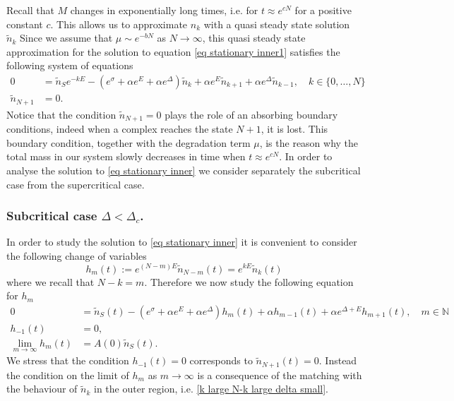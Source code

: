 \documentclass{article}
\numberwithin{equation}{section}
\theoremstyle{plain}
\begin{document}
Recall that $M$ changes in exponentially long times, i.e. for $t \approx e^{cN} $ for a positive constant $c$. 
This allows us to approximate $n_k$ with a quasi steady state solution $\tilde{n}_k$ 
Since we assume that $ \mu \sim e^{- b N } $ as $N \to \infty $, this quasi steady state approximation for the solution to equation \eqref{eq stationary inner1} satisfies the following system of equations
\begin{align} \label{eq stationary inner}
       0 &= \tilde{n}_S e^{- k E}  - \left( e^{\sigma } + \alpha e^E + \alpha e^\Delta  \right)   \tilde{n}_k + \alpha e^{E }  \tilde{n}_{k+1}  + \alpha e^{\Delta}  \tilde{n}_{k-1}, \quad  k \in \{0, \dots, N  \} \\
       \tilde{n}_{N+1}&=0. \nonumber
\end{align}
Notice that the condition $ \tilde{n}_{N+1} =0$ plays the role of an absorbing boundary conditions, indeed when a complex reaches the state $N+1$, it is lost. This boundary condition, together with the degradation term $\mu $, is the reason why the total mass in our system slowly decreases in time when $t \approx e^{cN } $. 
In order to analyse the solution to \eqref{eq stationary inner} we consider separately the subcritical case from the supercritical case. 
\subsubsection{Subcritical case $\Delta < \Delta_c $.}
In order to study the solution to \eqref{eq stationary inner} it is convenient to consider the following change of variables 
\begin{equation} \label{change of variable subcritical}
h_m (t) := e^{(N-m)E}  \tilde{n}_{N-m }(t) =e^{k E}  \tilde{n}_k (t)
\end{equation} 
where we recall that $N-k=m$. 
Therefore we now study the following equation for $h_m$ 
\begin{align} \label{eq inner delta <}
       0 &=  \tilde{n}_S(t)  - \left( e^{\sigma } + \alpha e^E + \alpha e^\Delta  \right)  h_m (t)+ \alpha  h_{m-1} (t) + \alpha e^{\Delta+ E} h_{m+1} (t), \quad m \in \mathbb N  \\
       h_{-1}(t)&=0 \nonumber, \\
   \lim_{m \to \infty } h_m(t) &=  A(0)  \tilde{n}_S(t)  .  \nonumber
\end{align}
We stress that the condition $h_{-1}(t)=0$ corresponds to $ \tilde{n}_{N+1}(t)=0$. Instead the condition on the limit of $h_m $ as $m \to \infty $ is a consequence of the matching with the behaviour of $ \tilde{n}_k$ in the outer region, i.e. \eqref{k large N-k large delta small}. 
\end{document}
